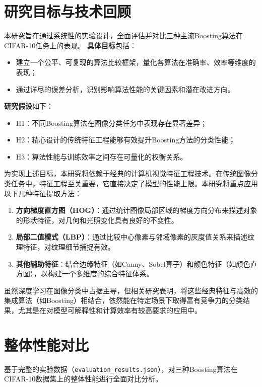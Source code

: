 \documentclass[UTF8]{report}
\theoremstyle{MyLineTheoremStyle} %
\theoremstyle{MyBlockTheoremStyle} %
\theoremstyle{MySubsubsectionStyle} %
\begin{document}
\section{研究目标与技术回顾}
本研究旨在通过系统性的实验设计，全面评估并对比三种主流Boosting算法在CIFAR-10任务上的表现。
\textbf{具体目标}包括：
\begin{itemize}
    \item 建立一个公平、可复现的算法比较框架，量化各算法在准确率、效率等维度的表现；
    \item 通过详尽的误差分析，识别影响算法性能的关键因素和潜在改进方向。
\end{itemize}
\textbf{研究假设}如下：
\begin{itemize}
    \item H1：不同Boosting算法在图像分类任务中表现存在显著差异；
    \item H2：精心设计的传统特征工程能够有效提升Boosting方法的分类性能；
    \item H3：算法性能与训练效率之间存在可量化的权衡关系。
\end{itemize}

为实现上述目标，本研究将依赖于经典的计算机视觉特征工程技术。在传统图像分类任务中，特征工程至关重要，它直接决定了模型的性能上限。本研究将重点应用以下几种特征提取方法：
\begin{enumerate}
    \item \textbf{方向梯度直方图（HOG）}：通过统计图像局部区域的梯度方向分布来描述对象的形状特征，对几何和光照变化具有良好的不变性。
    \item \textbf{局部二值模式（LBP）}：通过比较中心像素与邻域像素的灰度值关系来描述纹理特征，对纹理细节捕捉有效。
    \item \textbf{其他辅助特征}：结合边缘特征（如Canny、Sobel算子）和颜色特征（如颜色直方图），以构建一个多维度的综合特征体系。
\end{enumerate}
虽然深度学习在图像分类中占据主导，但相关研究表明，将这些经典特征与高效的集成算法（如Boosting）相结合，依然能在特定场景下取得富有竞争力的分类结果，尤其是在对模型可解释性和计算效率有较高要求的应用中。






\section{整体性能对比}
基于完整的实验数据（\texttt{evaluation\_results.json}），对三种Boosting算法在CIFAR-10数据集上的整体性能进行全面对比分析。
\end{document}

